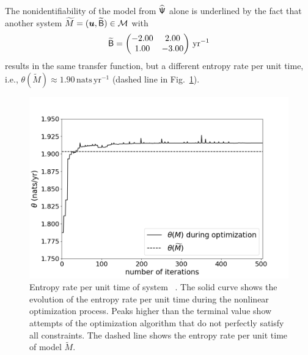 \documentclass[smallextended]{svjour3}
\makeatletter
\renewcommand*{\eqref}[1]{%
  \hyperref[{#1}]{\textup{\tagform@{\ref*{#1}}}}%
}
\newcommand{\yr}{\mathrm{yr}}
\newcommand{\nats}{\mathrm{nats}}
\newcommand{\ie}{i.e.}
\makeatother
\begin{document}
	The nonidentifiability of the model from $\widehat{\mathsf{\Psi}}$ alone is underlined by the fact that another system $\widetilde{M}=(\vec{u},\widetilde{\tens{B}})\in\mathcal{M}$ with
	\begin{equation*}
		\widetilde{\tens{B}} =
		\begin{pmatrix}
			-2.00 & 2.00 \\ 1.00 & -3.00
		\end{pmatrix}
		\,\yr^{-1}
	\end{equation*}
	results in the same transfer function, but a different entropy rate per unit time, \ie, $\theta(\widetilde{M}) \approx 1.90\,\nats\,\yr^{-1}$ (dashed line in Fig.~\ref{fig:optimization}).
	\begin{figure}[ht]
    \centering
    \includegraphics[width=0.95\linewidth]{figs/optimization.png}
		\caption{Entropy rate per unit time of system~\eqref{eqn:opt_example}. The solid curve shows the evolution of the entropy rate per unit time during the nonlinear optimization process.
		Peaks higher than the terminal value show attempts of the optimization algorithm that do not perfectly satisfy all constraints.
		The dashed line shows the entropy rate per unit time of model $\widetilde{M}$.
		}
		\label{fig:optimization}
\end{figure}
\end{document}
